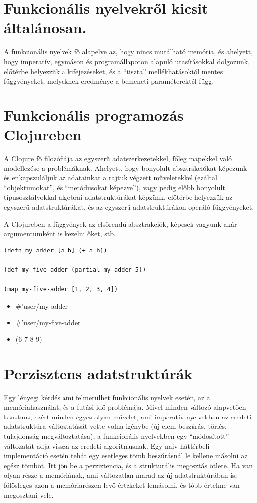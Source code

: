 \documentclass[final, 12pt] {ubb_dolgozat}{book}
\begin{document}
\section{Funkcionális nyelvekről kicsit általánosan.}
\label{sec:org1246615}
A funkcionális nyelvek fő alapelve az, hogy nincs mutálható memória, és ahelyett, hogy imperatív, egymáson
és programállapoton alapuló utasításokkal dolgozunk, előtérbe helyezzük a kifejezéseket, és a ``tiszta'' mellékhatásoktól
mentes függvényeket, melyeknek eredménye a bemeneti paraméterektől függ.

\section{Funkcionális programozás Clojureben}
\label{sec:orgf1d080a}
A Clojure fő filozófiája az egyszerű adatszerkezetekkel, főleg mapekkel való modellezése a problémáknak. Ahelyett, hogy
bonyolult absztrakciókat képezünk és enkapszuláljuk az adatainkat a rajtuk végzett műveletekkel (ezáltal ``objektumokat'',
és ``metódusokat képezve''), vagy pedig előbb bonyolult típusosztályokkal algebrai adatstruktúrákat képzünk, előtérbe
helyezzük az egyszerű adatstruktúrákat, és az egyszerű adatstruktúrákon operáló függvényeket.

A Clojureben a függvények az elsőrendű absztrakciók, képesek vagyunk akár argumentumként is kezelni őket, stb.

\begin{verbatim}
(defn my-adder [a b] (+ a b))

(def my-five-adder (partial my-adder 5))

(map my-five-adder [1, 2, 3, 4])

\end{verbatim}

\begin{itemize}
\item \#'user/my-adder
\item \#'user/my-five-adder
\item (6 7 8 9)
\end{itemize}

\section{Perzisztens adatstruktúrák}
\label{sec:org1ee9e0e}
Egy lényegi kérdés ami felmerülhet funkcionális nyelvek esetén, az a memóriahasználat, és a futási idő problémája. Mivel minden változó alapvetően konstans, ezért minden egyes olyan
művelet, ami imperatív nyelvekben az eredeti adatstruktúra változtatását vette volna igénybe (új elem beszúrás, törlés, tulajdonság megváltoztatása), a funkcionális nyelvekben
egy ``módosított'' változatát adja vissza az eredeti algoritmusnak. Egy naiv háttérbeli implementáció esetén tehát egy esetleges tömb beszúrásnál le kellene másolni az egész tömböt.
Itt jön be a perziztencia, és a strukturális megosztás ötlete. Ha van olyan része a memóriának, ami változatlan marad az új adatstruktúrában is, fölösleges azon a memóriarészen levő
értékeket lemásolni, és több értelme van megosztani vele.
\end{document}
